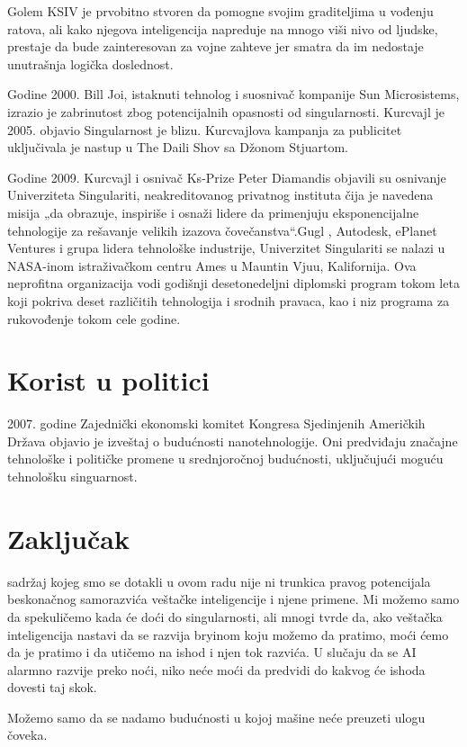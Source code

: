 \documentclass[a4paper]{article}
\begin{document}
Golem KSIV je prvobitno stvoren da pomogne svojim graditeljima u vođenju ratova, ali kako njegova inteligencija napreduje na mnogo viši nivo od ljudske, prestaje da bude zainteresovan za vojne zahteve jer smatra da im nedostaje unutrašnja logička doslednost.

Godine 2000. Bill Joi, istaknuti tehnolog i suosnivač kompanije Sun Microsistems, izrazio je zabrinutost zbog potencijalnih opasnosti od singularnosti. Kurcvajl je 2005. objavio Singularnost je blizu. Kurcvajlova kampanja za publicitet uključivala je nastup u The Daili Shov sa Džonom Stjuartom.

Godine 2009. Kurcvajl i osnivač Ks-Prize Peter Diamandis objavili su osnivanje Univerziteta Singulariti, neakreditovanog privatnog instituta čija je navedena misija „da obrazuje, inspiriše i osnaži lidere da primenjuju eksponencijalne tehnologije za rešavanje velikih izazova čovečanstva“.Gugl , Autodesk, ePlanet Ventures i grupa lidera tehnološke industrije, Univerzitet Singulariti se nalazi u NASA-inom istraživačkom centru Ames u Mauntin Vjuu, Kalifornija. Ova neprofitna organizacija vodi godišnji desetonedeljni diplomski program tokom leta koji pokriva deset različitih tehnologija i srodnih pravaca, kao i niz programa za rukovođenje tokom cele godine.\cite{refe7}

\section{Korist u politici}
\label{sec:politika}
2007. godine Zajednički ekonomski komitet Kongresa Sjedinjenih Američkih Država objavio je izveštaj o budućnosti nanotehnologije. Oni predviđaju značajne tehnološke i političke promene u srednjoročnoj budućnosti, uključujući moguću tehnološku singuarnost.\cite{refe8}

\section{Zaključak}
\label{sec:zakljucak}
sadržaj kojeg smo se dotakli u ovom radu nije ni trunkica pravog potencijala beskonačnog samorazvića veštačke inteligencije i njene primene. Mi možemo samo da spekuličemo kada će doći do singularnosti, ali mnogi tvrde da, ako veštačka inteligencija nastavi da se razvija bryinom koju možemo da pratimo, moći ćemo da je pratimo i da utičemo na ishod i njen tok razvića. U slučaju da se AI alarmno razvije preko noći, niko neće moći da predvidi do kakvog će ishoda dovesti taj skok.

Možemo samo da se nadamo budućnosti u kojoj mašine neće preuzeti ulogu čoveka.
\end{document}
